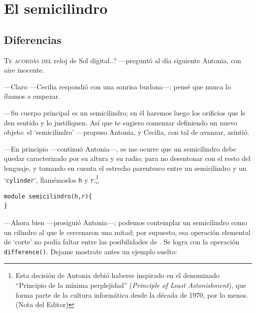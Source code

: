 \chapter{El semicilindro}
\label{semicilindro-1}

\section{Diferencias}

\lettrine[ante=\raisebox{-1.5ex}{\LARGE ---¿},lines=2]{T}{e acordás
  del} reloj de Sol digital..? ---preguntó al día siguiente Antonia,
con aire inocente.

---Claro ---Cecilia respondió con una sonrisa burlona---; pensé que
nunca lo íbamos a empezar.

---Su cuerpo principal es un semicilindro; en él haremos luego los
orificios que le den sentido y lo justifiquen. Así que te sugiero
comenzar definiendo un nuevo objeto: el `semicilindro' ---propuso
Antonia, y Cecilia, con tal de avanzar, asintió.

---En principio ---continuó Antonia---, se me ocurre que un
semicilindro debe quedar caracterizado por su altura y su radio; para
no desentonar con el resto del lenguaje, y tomando en cuenta el
estrecho parentezco entre un semicilindro y un `\lstinline!cylinder!',
llamémoslos \texttt{h} y \texttt{r}:\footnote{Esta decisión de Antonia
  debió haberse inspirado en el denominado ``Principio de la mínima
  perplejidad'' (\emph{Principle of Least Astonishment}), que forma
  parte de la cultura informática desde la década de 1970, por lo
  menos. (Nota del Editor)}

    \begin{lstlisting}
module semicilindro(h,r){
}
    \end{lstlisting}


    ---Ahora bien ---prosiguió Antonia---; podemos contemplar un
    semicilindro como un cilindro al que le cercenaron una mitad; por
    supuesto, esa operación elemental de `corte' no podía faltar entre
    las posibilidades de \openscad{}. Se logra con la operación
    \lstinline!difference()!. Dejame mostrate antes un ejemplo suelto:

